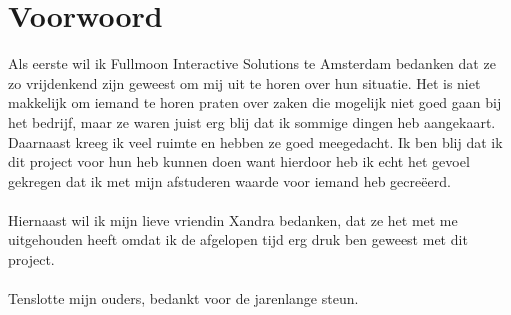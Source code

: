 \chapter*{Voorwoord} 

Als eerste wil ik Fullmoon Interactive Solutions te Amsterdam bedanken dat ze zo vrijdenkend zijn geweest om mij uit te horen over hun situatie. Het is niet makkelijk om iemand te horen praten over zaken die mogelijk niet goed gaan bij het bedrijf, maar ze waren juist erg blij dat ik sommige dingen heb aangekaart. Daarnaast kreeg ik veel ruimte en hebben ze goed meegedacht. Ik ben blij dat ik dit project voor hun heb kunnen doen want hierdoor heb ik echt het gevoel gekregen dat ik met mijn afstuderen waarde voor iemand heb gecreëerd.
\\\\
Hiernaast wil ik mijn lieve vriendin Xandra bedanken, dat ze het met me uitgehouden heeft omdat ik de afgelopen tijd erg druk ben geweest met dit project.
\\\\
Tenslotte mijn ouders, bedankt voor de jarenlange steun.
